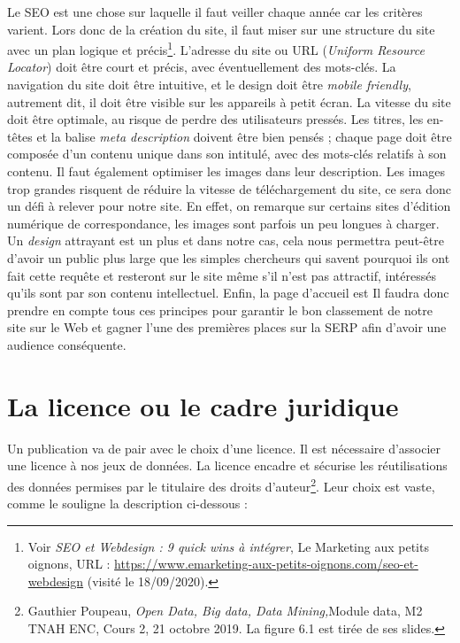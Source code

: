 Le SEO est une chose sur laquelle il faut veiller chaque année car les critères varient. Lors donc de la création du site, il faut miser sur une structure du site avec un plan logique et précis\footnote{Voir \emph{SEO et Webdesign : 9 quick wins à intégrer}, Le Marketing aux petits oignons, URL : \url{https://www.emarketing-aux-petits-oignons.com/seo-et-webdesign} (visité le 18/09/2020).}. L'adresse du site ou URL (\emph{Uniform Resource Locator}) doit être court et précis, avec éventuellement des mots-clés. La navigation du site doit être intuitive, et le design doit être \emph{mobile friendly}, autrement dit, il doit être visible sur les appareils à petit écran. La vitesse du site doit être optimale, au risque de perdre des utilisateurs pressés. Les titres, les en-têtes et la balise \emph{meta description} doivent être bien pensés ; chaque page doit être composée d'un contenu unique dans son intitulé, avec des mots-clés relatifs à son contenu. Il faut également optimiser les images dans leur description. Les images trop grandes risquent de réduire la vitesse de téléchargement du site, ce sera donc un défi à relever pour notre site. En effet, on remarque sur certains sites d'édition numérique de correspondance, les images sont parfois un peu longues à charger. Un \emph{design} attrayant est un plus et dans notre cas, cela nous permettra peut-être d'avoir un public plus large que les simples chercheurs qui savent pourquoi ils ont fait cette requête et resteront sur le site même s'il n'est pas attractif, intéressés qu'ils sont par son contenu intellectuel. 
Enfin, la page d’accueil est  Il faudra donc prendre en compte tous ces principes pour garantir le bon classement de notre site sur le Web et gagner l'une des premières places sur la SERP afin d'avoir une audience conséquente.

\section{La licence ou le cadre juridique}

Un publication va de pair avec le choix d'une licence. Il est nécessaire d'associer une licence à nos jeux de données. La licence encadre et sécurise les réutilisations des données permises par le titulaire des droits d'auteur\footnote{Gauthier Poupeau, \emph{Open Data, Big data, Data Mining,}Module data, M2 TNAH ENC, Cours 2, 21 octobre 2019. La figure 6.1 est tirée de ses slides.}. Leur choix est vaste, comme le souligne la description ci-dessous :

